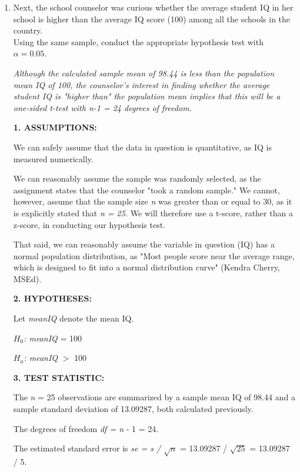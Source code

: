 \documentclass[12pt,letterpaper]{article}
\begin{document}
\begin{enumerate}
		\item Next, the school counselor was curious  whether  the average student IQ in her school is higher than the average IQ score (100) among all the schools in the country.\\ 
		
		\noindent Using the same sample, conduct the appropriate hypothesis test with $\alpha=0.05$. 
		\vspace{.5cm}
		
		\textit{Although the calculated sample mean of 98.44 is less than the population mean IQ of 100, the counselor's interest in finding whether the average student IQ is "higher than" the population mean implies that this will be a one-sided t-test with n-1 = 24 degrees of freedom.}
		
		\textbf{1. ASSUMPTIONS: }
		
		We can safely assume that the data in question is quantitative, as IQ is measured numerically. 
		
		We can reasonably assume the sample was randomly selected, as the assignment states that the counselor "took a random sample." We cannot, however, assume that the sample size \textit{n} was greater than or equal to 30, as it is explicitly stated that \textit{n = 25.} We will therefore use a t-score, rather than a z-score, in conducting our hypothesis test. 
		
		That said, we can reasonably assume the variable in question (IQ) has a normal population distribution, as "Most people score near the average range, which is designed to fit into a normal distribution curve" (Kendra Cherry, MSEd).
		
		\textbf{2. HYPOTHESES: }
		
		Let \textit{meanIQ} denote the mean IQ.
		
		\textit{$H_0$: meanIQ} = 100
		
		\textit{$H_a$: meanIQ} $>$ 100
		
		\textbf{3. TEST STATISTIC: }
		
		The \textit{n} = 25 observations are summarized by a sample mean IQ of 98.44 and a sample standard deviation of 13.09287, both calculated previously.
		
		The degrees of freedom \textit{df = n} - 1 = 24. 
		
		The estimated standard error is \textit{se = s / $\sqrt{n}$} = 13.09287 / $\sqrt{25}$ = 13.09287 / 5.
		
		
		

\end{enumerate}
\end{document}
